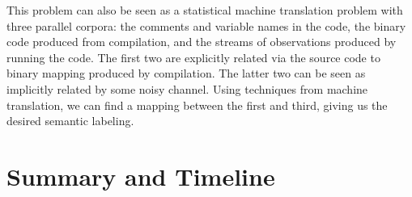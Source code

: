 \documentclass{article}
\begin{document}
This problem can also be seen as a statistical machine translation
problem with three parallel corpora: the comments and variable names in
the code, the binary code produced from compilation, and the streams of
observations produced by running the code. The first two are explicitly
related via the source code to binary mapping produced by compilation.
The latter two can be seen as implicitly related by some noisy channel.
Using techniques from machine translation, we can find a mapping between
the first and third, giving us the desired semantic labeling.

\section{Summary and Timeline}





\end{document}
